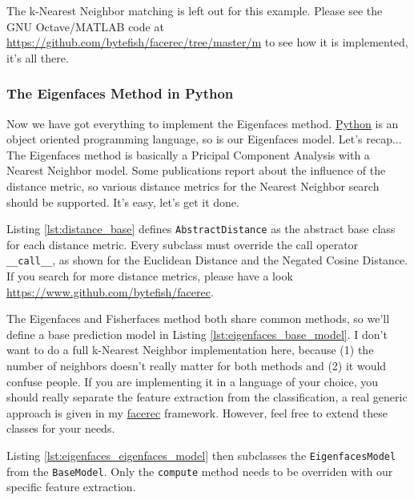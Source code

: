 \ifx\python\undefined
	The k-Nearest Neighbor matching is left out for this example. Please see the GNU Octave/MATLAB code at \url{https://github.com/bytefish/facerec/tree/master/m} to see how it is implemented, it's all there.
\else
	\subsubsection{The Eigenfaces Method in Python}
	Now we have got everything to implement the Eigenfaces method. \href{http://www.python.org}{Python} is an object oriented programming language, so is our Eigenfaces model. Let's recap... The Eigenfaces method is basically a Pricipal Component Analysis with a Nearest Neighbor model. Some publications report about the influence of the distance metric, so various distance metrics for the Nearest Neighbor search should be supported. It's easy, let's get it done. 
	
	Listing \ref{lst:distance_base} defines \lstinline|AbstractDistance| as the abstract base class for each distance metric. Every subclass must override the call operator \lstinline|__call__|, as shown for the Euclidean Distance and the Negated Cosine Distance. If you search for more distance metrics, please have a look \url{https://www.github.com/bytefish/facerec}.
	
	
	
	The Eigenfaces and Fisherfaces method both share common methods, so we'll define a base prediction model in Listing \ref{lst:eigenfaces_base_model}. I don't want to do a full k-Nearest Neighbor implementation here, because (1) the number of neighbors doesn't really matter for both methods and (2) it would confuse people. If you are implementing it in a language of your choice, you should really separate the feature extraction from the classification, a real generic approach is given in my \href{https://www.github.com/bytefish/facerec}{facerec} framework. However, feel free to extend these classes for your needs.
	
	

	Listing \ref{lst:eigenfaces_eigenfaces_model} then subclasses the \lstinline|EigenfacesModel| from the \lstinline|BaseModel|. Only the \lstinline|compute| method needs to be overriden with our specific feature extraction.
	
